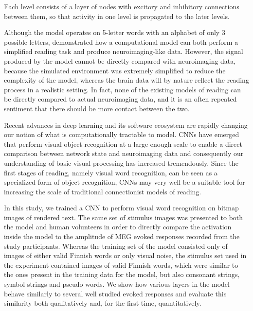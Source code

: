 \documentclass[a4paper, 10pt]{vanvliet_paper}
\begin{document}
Each level consists of a layer of nodes with excitory and inhibitory connections between them, so that activity in one level is propagated to the later levels.


Although the model operates on 5-letter words with an alphabet of only 3 possible letters, \textcite{Laszlo2012} demonstrated how a computational model can both perform a simplified reading task and produce neuroimaging-like data.
However, the signal produced by the model cannot be directly compared with neuroimaging data, because the simulated environment was extremely simplified to reduce the complexity of the model, whereas the brain data will by nature reflect the reading process in a realistic setting.
In fact, none of the existing models of reading can be directly compared to actual neuroimaging data, and it is an often repeated sentiment that there should be more contact between the two\cite{Carreiras2014, Laszlo2012, Laszlo2014, Poeppel2012, Taylor2013}.

Recent advances in deep learning and its software ecosystem are rapidly changing our notion of what is computationally tractable to model\cite{Richards2019}.
\Glspl{CNN} have emerged that perform visual object recognition at a large enough scale to enable a direct comparison between network state and neuroimaging data\cite{Schrimpf2018, Devereux2018, Yamins2016} and consequently our understanding of basic visual processing has increased tremendously\cite{Lindsay2020}.
Since the first stages of reading, namely visual word recognition, can be seen as a specialized form of object recognition, \glspl{CNN} may very well be a suitable tool for increasing the scale of traditional connectionist models of reading.

In this study, we trained a \gls{CNN} to perform visual word recognition on bitmap images of rendered text.
The same set of stimulus images was presented to both the model and human volunteers in order to directly compare the activation inside the model to the amplitude of \gls{MEG} evoked responses recorded from the study participants.
Whereas the training set of the model consisted only of images of either valid Finnish words or only visual noise, the stimulus set used in the experiment contained images of valid Finnish words, which were similar to the ones present in the training data for the model, but also consonant strings, symbol strings and pseudo-words.
We show how various layers in the model behave similarly to several well studied evoked responses and evaluate this similarity both qualitatively and, for the first time, quantitatively.
\end{document}
